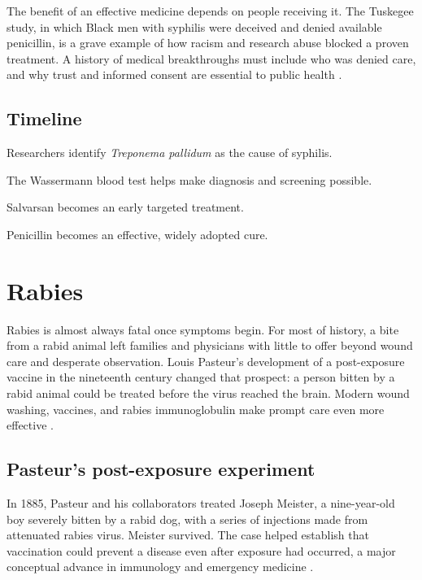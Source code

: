 \documentclass[12pt,oneside]{book}
\begin{document}
The benefit of an effective medicine depends on people receiving it. The
Tuskegee study, in which Black men with syphilis were deceived and denied
available penicillin, is a grave example of how racism and research abuse
blocked a proven treatment. A history of medical breakthroughs must include
who was denied care, and why trust and informed consent are essential to
public health \cite{cdcSyphilisHistory}.

\section*{Timeline}
\begin{description}[leftmargin=2.3cm,style=nextline]
  \item[1905] Researchers identify \emph{Treponema pallidum} as the cause of syphilis.
  \item[1906] The Wassermann blood test helps make diagnosis and screening possible.
  \item[1910] Salvarsan becomes an early targeted treatment.
  \item[1940s] Penicillin becomes an effective, widely adopted cure.
\end{description}

\chapter[Rabies]{Rabies}

Rabies is almost always fatal once symptoms begin. For most of history, a bite
from a rabid animal left families and physicians with little to offer beyond
wound care and desperate observation. Louis Pasteur's development of a
post-exposure vaccine in the nineteenth century changed that prospect: a
person bitten by a rabid animal could be treated before the virus reached the
brain. Modern wound washing, vaccines, and rabies immunoglobulin make prompt
care even more effective \cite{cdcPasteurVaccination,cdcRabiesEID}.

\section{Pasteur's post-exposure experiment}
In 1885, Pasteur and his collaborators treated Joseph Meister, a nine-year-old
boy severely bitten by a rabid dog, with a series of injections made from
attenuated rabies virus. Meister survived. The case helped establish that
vaccination could prevent a disease even after exposure had occurred, a major
conceptual advance in immunology and emergency medicine
\cite{cdcPasteurVaccination}.
\end{document}
